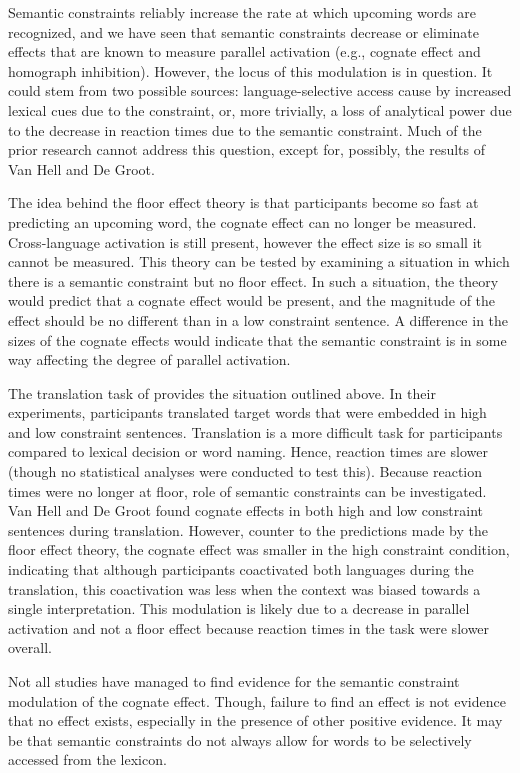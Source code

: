 Semantic constraints reliably increase the rate at which upcoming words are recognized, and we have seen that semantic constraints decrease or eliminate effects that are known to measure parallel activation (e.g., cognate effect and homograph inhibition). However, the locus of this modulation is in question. It could stem from two possible sources: language-selective access cause by increased lexical cues due to the constraint, or, more trivially, a loss of analytical power due to the decrease in reaction times due to the semantic constraint. Much of the prior research cannot address this question, except for, possibly, the results of Van Hell and De Groot.  

The idea behind the floor effect theory is that participants become so fast at predicting an upcoming word, the cognate effect can no longer be measured. Cross-language activation is still present, however the effect size is so small it cannot be measured. This theory can be tested by examining a situation in which there is a semantic constraint but no floor effect. In such a situation, the theory would predict that a cognate effect would be present, and the magnitude of the effect should be no different than in a low constraint sentence. A difference in the sizes of the cognate  effects would indicate that the semantic constraint is in some way affecting the degree of parallel activation.

The translation task of \textcite{VanHell2008} provides the situation outlined above. In their experiments, participants translated target words that were embedded in high and low constraint sentences. Translation is a more difficult task for participants compared to lexical decision or word naming. Hence, reaction times are slower (though no statistical analyses were conducted to test this). Because reaction times were no longer at floor, role of semantic constraints can be investigated. Van Hell and De Groot found cognate effects in both high and low constraint sentences during translation. However, counter to the predictions made by the floor effect theory, the cognate effect was smaller in the high constraint condition, indicating that although participants coactivated both languages during the translation, this coactivation was less when the context was biased towards a single interpretation. This modulation is likely due to a decrease in parallel activation and not a floor effect because reaction times in the task were slower overall. 

Not all studies have managed to find evidence for the semantic constraint modulation of the cognate effect. Though, failure to find an effect is not evidence that no effect exists, especially in the presence of other positive evidence. It may be that semantic constraints do not always allow for words to be selectively accessed from the lexicon. 

